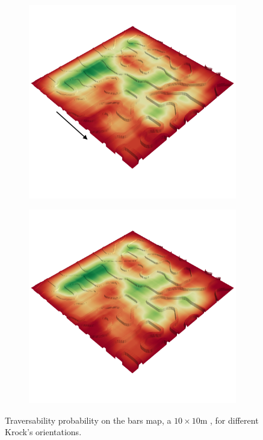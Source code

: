\documentclass[../document.tex]{subfiles}
\begin{document}
\begin{figure} [htbp]
\begin{subfigure}[b]{0.45\textwidth}
  \end{subfigure}
  \begin{subfigure}[b]{0.45\textwidth}
    \includegraphics[width=\linewidth]{../img/4/traversability/bars/-0.png}
  \end{subfigure}
  \begin{subfigure}[b]{0.45\textwidth}
      \includegraphics[width=\linewidth]{../img/4/traversability/bars/-180.png}  
  \end{subfigure}
  \caption{Traversability probability on the bars map, a $10\times 10$m , for different Krock's orientations.}
  \label{fig : bars-trav}
  \end{figure}
\end{document}
